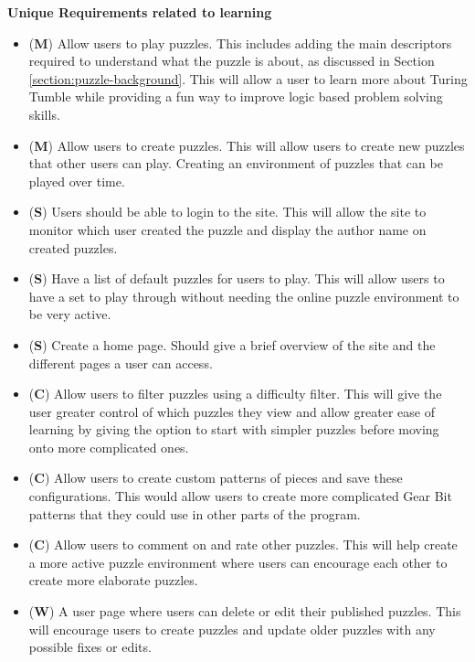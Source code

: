 \documentclass{l4proj}
\begin{document}
\textbf{Unique Requirements related to learning}
\begin{itemize}
    \item (\textbf{M}) Allow users to play puzzles. This includes adding the main descriptors required to understand what the puzzle is about, as discussed in Section \ref{section:puzzle-background}. This will allow a user to learn more about Turing Tumble while providing a fun way to improve logic based problem solving skills.
    \item (\textbf{M}) Allow users to create puzzles. This will allow users to create new puzzles that other users can play. Creating an environment of puzzles that can be played over time.
    \item (\textbf{S}) Users should be able to login to the site. This will allow the site to monitor which user created the puzzle and display the author name on created puzzles.
    \item (\textbf{S}) Have a list of default puzzles for users to play. This will allow users to have a set to play through without needing the online puzzle environment to be very active.
    \item (\textbf{S}) Create a home page. Should give a brief overview of the site and the different pages a user can access.
    \item (\textbf{C}) Allow users to filter puzzles using a difficulty filter. This will give the user greater control of which puzzles they view and allow greater ease of learning by giving the option to start with simpler puzzles before moving onto more complicated ones.
    \item (\textbf{C}) Allow users to create custom patterns of pieces and save these configurations. This would allow users to create more complicated Gear Bit patterns that they could use in other parts of the program.
    \item (\textbf{C}) Allow users to comment on and rate other puzzles. This will help create a more active puzzle environment where users can encourage each other to create more elaborate puzzles.
    \item (\textbf{W}) A user page where users can delete or edit their published puzzles. This will encourage users to create puzzles and update older puzzles with any possible fixes or edits.
\end{itemize}
\end{document}
